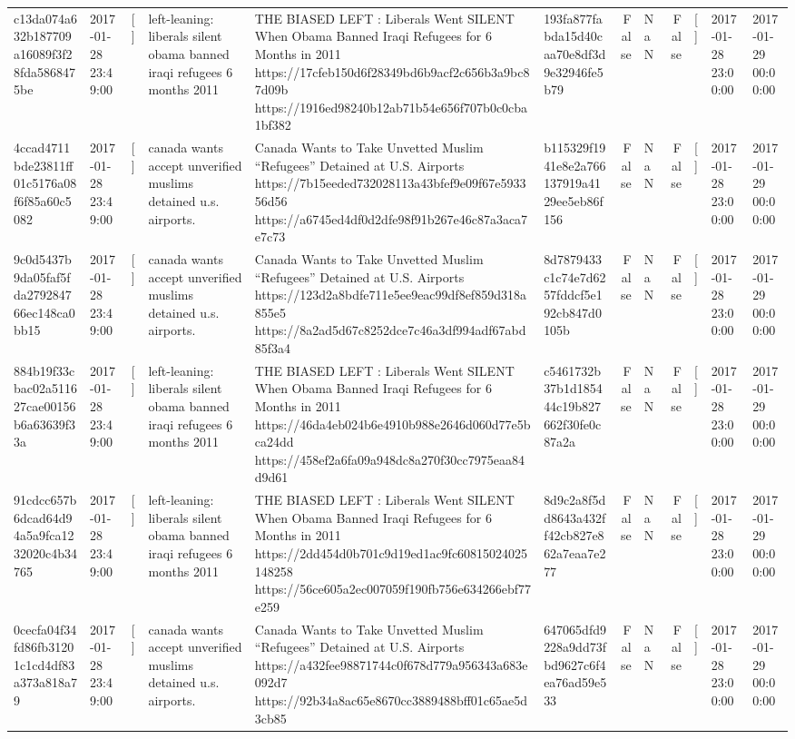 \begin{tabular}{llllllrlrlll}
c13da074a632b187709a16089f3f28fda5868475be & 2017-01-28 23:49:00 & [] & left-leaning: liberals silent obama banned iraqi refugees 6 months 2011 & THE BIASED LEFT : Liberals Went SILENT When Obama Banned Iraqi Refugees for 6 Months in 2011 https://17cfeb150d6f28349bd6b9acf2c656b3a9bc87d09b https://1916ed98240b12ab71b54e656f707b0c0cba1bf382 & 193fa877fabda15d40caa70e8df3d9e32946fe5b79 & False & NaN & False & [] & 2017-01-28 23:00:00 & 2017-01-29 00:00:00 \\
4ccad4711bde23811ff01c5176a08f6f85a60c5082 & 2017-01-28 23:49:00 & [] & canada wants accept unverified muslims detained u.s. airports. & Canada Wants to Take Unvetted Muslim “Refugees” Detained at U.S. Airports https://7b15eeded732028113a43bfef9e09f67e593356d56 https://a6745ed4df0d2dfe98f91b267e46c87a3aca7e7c73 & b115329f1941e8e2a766137919a4129ee5eb86f156 & False & NaN & False & [] & 2017-01-28 23:00:00 & 2017-01-29 00:00:00 \\
9c0d5437b9da05faf5fda279284766ec148ca0bb15 & 2017-01-28 23:49:00 & [] & canada wants accept unverified muslims detained u.s. airports. & Canada Wants to Take Unvetted Muslim “Refugees” Detained at U.S. Airports https://123d2a8bdfe711e5ee9eac99df8ef859d318a855e5 https://8a2ad5d67c8252dce7c46a3df994adf67abd85f3a4 & 8d7879433c1c74e7d6257fddcf5e192cb847d0105b & False & NaN & False & [] & 2017-01-28 23:00:00 & 2017-01-29 00:00:00 \\
884b19f33cbac02a511627cae00156b6a63639f33a & 2017-01-28 23:49:00 & [] & left-leaning: liberals silent obama banned iraqi refugees 6 months 2011 & THE BIASED LEFT : Liberals Went SILENT When Obama Banned Iraqi Refugees for 6 Months in 2011 https://46da4eb024b6e4910b988e2646d060d77e5bca24dd https://458ef2a6fa09a948dc8a270f30cc7975eaa84d9d61 & c5461732b37b1d185444c19b827662f30fe0c87a2a & False & NaN & False & [] & 2017-01-28 23:00:00 & 2017-01-29 00:00:00 \\
91cdcc657b6dcad64d94a5a9fca1232020c4b34765 & 2017-01-28 23:49:00 & [] & left-leaning: liberals silent obama banned iraqi refugees 6 months 2011 & THE BIASED LEFT : Liberals Went SILENT When Obama Banned Iraqi Refugees for 6 Months in 2011 https://2dd454d0b701c9d19ed1ac9fc60815024025148258 https://56ce605a2ec007059f190fb756e634266ebf77e259 & 8d9c2a8f5dd8643a432ff42cb827e862a7eaa7e277 & False & NaN & False & [] & 2017-01-28 23:00:00 & 2017-01-29 00:00:00 \\
0cecfa04f34fd86fb31201c1cd4df83a373a818a79 & 2017-01-28 23:49:00 & [] & canada wants accept unverified muslims detained u.s. airports. & Canada Wants to Take Unvetted Muslim “Refugees” Detained at U.S. Airports https://a432fee98871744c0f678d779a956343a683e092d7 https://92b34a8ac65e8670cc3889488bff01c65ae5d3cb85 & 647065dfd9228a9dd73fbd9627c6f4ea76ad59e533 & False & NaN & False & [] & 2017-01-28 23:00:00 & 2017-01-29 00:00:00 \\

\end{tabular}
